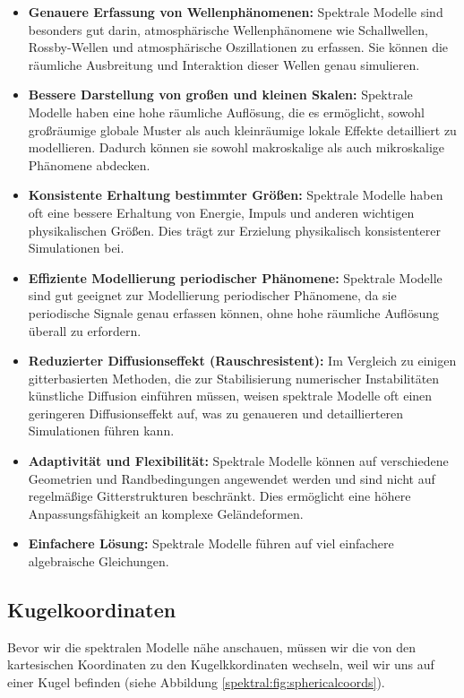 \begin{itemize}
\item
\textbf{Genauere Erfassung von Wellenphänomenen:} Spektrale Modelle sind besonders gut darin, atmosphärische Wellenphänomene wie Schallwellen, Rossby-Wellen und atmosphärische Oszillationen zu erfassen.
Sie können die räumliche Ausbreitung und Interaktion dieser Wellen genau simulieren.
\item
\textbf{Bessere Darstellung von großen und kleinen Skalen:} Spektrale Modelle haben eine hohe räumliche Auflösung, die es ermöglicht, sowohl großräumige globale Muster als auch kleinräumige lokale Effekte detailliert zu modellieren.
Dadurch können sie sowohl makroskalige als auch mikroskalige Phänomene abdecken.
\item
\textbf{Konsistente Erhaltung bestimmter Größen:} Spektrale Modelle haben oft eine bessere Erhaltung von Energie, Impuls und anderen wichtigen physikalischen Größen.
Dies trägt zur Erzielung physikalisch konsistenterer Simulationen bei.
\item
\textbf{Effiziente Modellierung periodischer Phänomene:} Spektrale Modelle sind gut geeignet zur Modellierung periodischer Phänomene, da sie periodische Signale genau erfassen können, ohne hohe räumliche Auflösung überall zu erfordern.
\item
\textbf{Reduzierter Diffusionseffekt (Rauschresistent):} Im Vergleich zu einigen gitterbasierten Methoden, die zur Stabilisierung numerischer Instabilitäten künstliche Diffusion einführen müssen, weisen spektrale Modelle oft einen geringeren Diffusionseffekt auf, was zu genaueren und detaillierteren Simulationen führen kann.
\item
\textbf{Adaptivität und Flexibilität:} Spektrale Modelle können auf verschiedene Geometrien und Randbedingungen angewendet werden und sind nicht auf regelmäßige Gitterstrukturen beschränkt.
Dies ermöglicht eine höhere Anpassungsfähigkeit an komplexe Geländeformen.
\item
\textbf{Einfachere Lösung:} Spektrale Modelle führen auf viel einfachere algebraische Gleichungen.
\end{itemize}

\subsection{Kugelkoordinaten
\label{spektral:subsection:kugelkoordinaten}}

Bevor wir die spektralen Modelle nähe anschauen, müssen wir die von
den kartesischen Koordinaten zu den Kugelkkordinaten wechseln, weil
wir uns auf einer Kugel befinden (siehe Abbildung
\ref{spektral:fig:sphericalcoords}).

